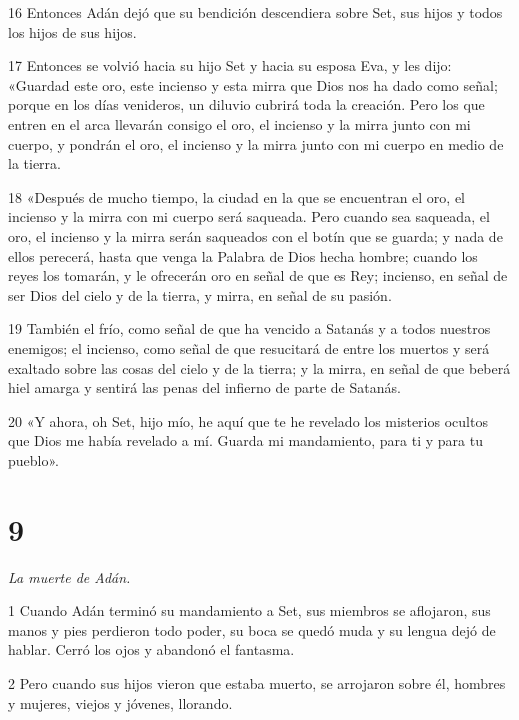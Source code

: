 \par 16 Entonces Adán dejó que su bendición descendiera sobre Set, sus hijos y todos los hijos de sus hijos.

\par 17 Entonces se volvió hacia su hijo Set y hacia su esposa Eva, y les dijo: «Guardad este oro, este incienso y esta mirra que Dios nos ha dado como señal; porque en los días venideros, un diluvio cubrirá toda la creación. Pero los que entren en el arca llevarán consigo el oro, el incienso y la mirra junto con mi cuerpo, y pondrán el oro, el incienso y la mirra junto con mi cuerpo en medio de la tierra.

\par 18 «Después de mucho tiempo, la ciudad en la que se encuentran el oro, el incienso y la mirra con mi cuerpo será saqueada. Pero cuando sea saqueada, el oro, el incienso y la mirra serán saqueados con el botín que se guarda; y nada de ellos perecerá, hasta que venga la Palabra de Dios hecha hombre; cuando los reyes los tomarán, y le ofrecerán oro en señal de que es Rey; incienso, en señal de ser Dios del cielo y de la tierra, y mirra, en señal de su pasión.

\par 19 También el frío, como señal de que ha vencido a Satanás y a todos nuestros enemigos; el incienso, como señal de que resucitará de entre los muertos y será exaltado sobre las cosas del cielo y de la tierra; y la mirra, en señal de que beberá hiel amarga y sentirá las penas del infierno de parte de Satanás.

\par 20 «Y ahora, oh Set, hijo mío, he aquí que te he revelado los misterios ocultos que Dios me había revelado a mí. Guarda mi mandamiento, para ti y para tu pueblo».

\chapter{9}

\par \textit{La muerte de Adán.}

\par 1 Cuando Adán terminó su mandamiento a Set, sus miembros se aflojaron, sus manos y pies perdieron todo poder, su boca se quedó muda y su lengua dejó de hablar. Cerró los ojos y abandonó el fantasma.

\par 2 Pero cuando sus hijos vieron que estaba muerto, se arrojaron sobre él, hombres y mujeres, viejos y jóvenes, llorando.

